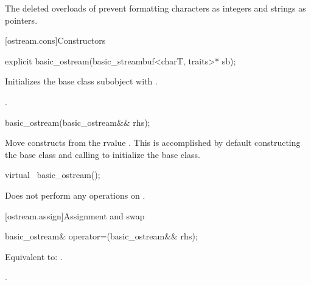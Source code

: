 \pnum
\begin{note}
The deleted overloads of 
prevent formatting characters as integers and strings as pointers.
\end{note}

[ostream.cons]{Constructors}

%
\begin{itemdecl}
explicit basic_ostream(basic_streambuf<charT, traits>* sb);
\end{itemdecl}

%
\begin{itemdescr}
\pnum
\effects
Initializes the base class subobject with
.

\pnum
\ensures
{}.
\end{itemdescr}

%
\begin{itemdecl}
basic_ostream(basic_ostream&& rhs);
\end{itemdecl}

\begin{itemdescr}
\pnum
\effects
Move constructs from the rvalue .
This is accomplished by default constructing the base class and calling
 to initialize the
base class.
\end{itemdescr}

%
\begin{itemdecl}
virtual ~basic_ostream();
\end{itemdecl}

\begin{itemdescr}
\pnum
\remarks
Does not perform any operations on
.
\end{itemdescr}

[ostream.assign]{Assignment and swap}

%
\begin{itemdecl}
basic_ostream& operator=(basic_ostream&& rhs);
\end{itemdecl}

\begin{itemdescr}
\pnum
\effects
Equivalent to: .

\pnum
\returns
{}.
\end{itemdescr}

